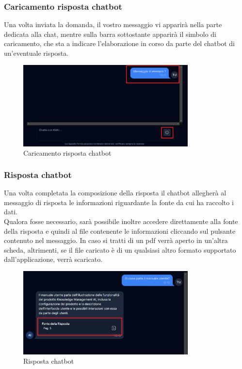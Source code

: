 \subsubsection{Caricamento risposta chatbot}
Una volta inviata la domanda, il vostro messaggio vi apparirà nella parte dedicata alla chat, mentre sulla barra sottostante apparirà il simbolo di caricamento, che sta a indicare l'elaborazione in corso da parte del chatbot di un'eventuale risposta.
\begin{figure}[h!]
    \centering
    \includegraphics[width=0.8\textwidth]{loadingchatresponse.png}
    \caption{Caricamento risposta chatbot}\label{fig:loadingchatresponse}
\end{figure}
\subsubsection{Risposta chatbot}
Una volta completata la composizione della risposta il chatbot allegherà al messaggio di risposta le informazioni riguardante la fonte da cui ha raccolto i dati.\\
Qualora fosse necessario, sarà possibile inoltre accedere direttamente alla fonte della risposta e quindi al file contenente le informazioni cliccando sul pulsante contenuto nel messaggio.
In caso si tratti di un pdf verrà aperto in un’altra scheda, altrimenti, se il file caricato è di un qualsiasi altro formato supportato dall’applicazione, verrà scaricato.
\begin{figure}[h!]
    \centering
    \includegraphics[width=0.8\textwidth]{rispostachat.png}
    \caption{Risposta chatbot}\label{fig:rispostachat}
\end{figure}

